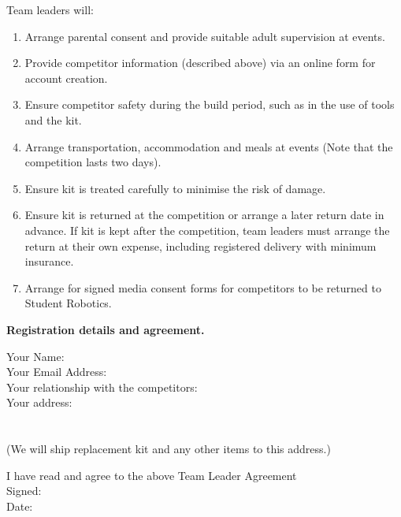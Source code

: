 \documentclass[a4paper, 11pt]{scrartcl}
\begin{document}
Team leaders will:

\begin{enumerate}
\item Arrange parental consent and provide suitable adult supervision at
events.

\item Provide competitor information (described above) via an online form for
account creation.

\item Ensure competitor safety during the build period, such as in the use of
tools and the kit.

\item Arrange transportation, accommodation and meals at events (Note that
the competition lasts two days).

\item Ensure kit is treated carefully to minimise the risk of damage.

\item Ensure kit is returned at the competition or arrange a later return
date in advance.  If kit is kept after the competition, team leaders must
arrange the return at their own expense, including registered delivery with
minimum  insurance.

\item Arrange for signed media consent forms for competitors to be returned
to Student Robotics.
\end{enumerate}

\newpage

\textbf{Registration details and agreement.}

\vspace{20pt}
\doublespacing
\noindent
Your Name:\hrulefill\\
Your Email Address:\hrulefill\\
Your relationship with the competitors:\hrulefill\\
Your address:\hrulefill\\
\hbox{}\hrulefill\\
\hbox{}\hrulefill\\
(We will ship replacement kit and any other items to this address.)

\noindent
\dotfill\hfill

\noindent
I have read and agree to the above Team Leader Agreement\\
Signed:\hrulefill\\
Date:\hrulefill\\

\singlespacing
\end{document}
